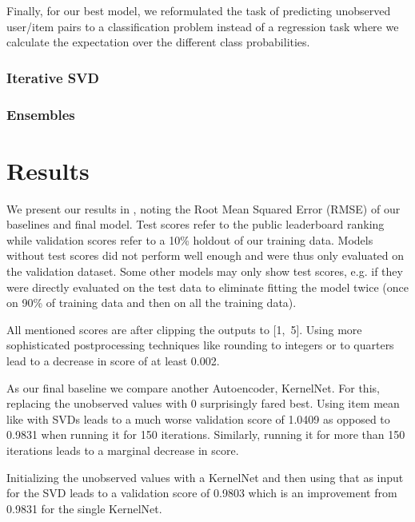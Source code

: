 \documentclass[10pt,conference,compsocconf]{IEEEtran}
\begin{document}
    Finally, for our best model, we reformulated the task of predicting unobserved user/item pairs to a classification problem instead of a regression task where we calculate the expectation over the different class probabilities.

    \subsubsection{Iterative SVD}

    \subsubsection{Ensembles}


    \section{Results}
    We present our results in , noting the Root Mean Squared Error (RMSE) of our baselines and final model.
    Test scores refer to the public leaderboard ranking while validation scores refer to a 10\% holdout of our training data.
    Models without test scores did not perform well enough and were thus only evaluated on the validation dataset.
    Some other models may only show test scores, e.g. if they were directly evaluated on the test data to eliminate
    fitting the model twice (once on 90\% of training data and then on all the training data).

    All mentioned scores are after clipping the outputs to [1,~5].
    Using more sophisticated postprocessing techniques like rounding to integers or to quarters lead to a decrease in score of at least 0.002.


    As our final baseline we compare another Autoencoder, KernelNet.
    For this, replacing the unobserved values with 0 surprisingly fared best.
    Using item mean like with SVDs leads to a much worse validation score of 1.0409 as opposed to 0.9831 when running it for 150 iterations.
    Similarly, running it for more than 150 iterations leads to a marginal decrease in score.

    Initializing the unobserved values with a KernelNet and then using that as input for the SVD leads to a validation score of 0.9803 which is an improvement from 0.9831 for the single KernelNet.
\end{document}
